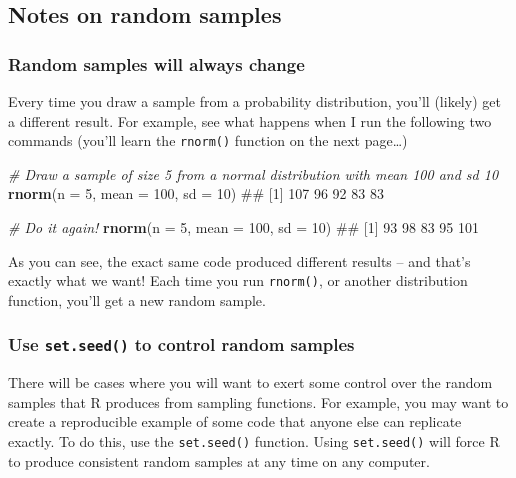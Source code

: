 \documentclass[]{book}
\newenvironment{Shaded}{\begin{snugshade}}{\end{snugshade}}
\newcommand{\KeywordTok}[1]{\textcolor[rgb]{0.13,0.29,0.53}{\textbf{{#1}}}}
\newcommand{\DataTypeTok}[1]{\textcolor[rgb]{0.13,0.29,0.53}{{#1}}}
\newcommand{\DecValTok}[1]{\textcolor[rgb]{0.00,0.00,0.81}{{#1}}}
\newcommand{\CommentTok}[1]{\textcolor[rgb]{0.56,0.35,0.01}{\textit{{#1}}}}
\newcommand{\NormalTok}[1]{{#1}}
\theoremstyle{definition}
\theoremstyle{definition}
\theoremstyle{remark}
\begin{document}
\subsection{Notes on random samples}\label{notes-on-random-samples}

\subsubsection{Random samples will always
change}\label{random-samples-will-always-change}

Every time you draw a sample from a probability distribution, you'll
(likely) get a different result. For example, see what happens when I
run the following two commands (you'll learn the \texttt{rnorm()}
function on the next page\ldots{})

\begin{Shaded}
\begin{Highlighting}[]
\CommentTok{# Draw a sample of size 5 from a normal distribution with mean 100 and sd 10}
\KeywordTok{rnorm}\NormalTok{(}\DataTypeTok{n =} \DecValTok{5}\NormalTok{, }\DataTypeTok{mean =} \DecValTok{100}\NormalTok{, }\DataTypeTok{sd =} \DecValTok{10}\NormalTok{)}
\NormalTok{## [1] 107  96  92  83  83}

\CommentTok{# Do it again!}
\KeywordTok{rnorm}\NormalTok{(}\DataTypeTok{n =} \DecValTok{5}\NormalTok{, }\DataTypeTok{mean =} \DecValTok{100}\NormalTok{, }\DataTypeTok{sd =} \DecValTok{10}\NormalTok{)}
\NormalTok{## [1]  93  98  83  95 101}
\end{Highlighting}
\end{Shaded}

As you can see, the exact same code produced different results -- and
that's exactly what we want! Each time you run \texttt{rnorm()}, or
another distribution function, you'll get a new random sample.

\subsubsection{\texorpdfstring{Use \texttt{set.seed()} to control random
samples}{Use set.seed() to control random samples}}\label{use-set.seed-to-control-random-samples}

There will be cases where you will want to exert some control over the
random samples that R produces from sampling functions. For example, you
may want to create a reproducible example of some code that anyone else
can replicate exactly. To do this, use the \texttt{set.seed()} function.
Using \texttt{set.seed()} will force R to produce consistent random
samples at any time on any computer.
\end{document}
